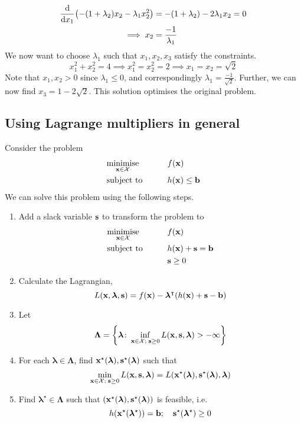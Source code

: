 \begin{example}
	\begin{align*}
		\dv{x_1} (-(1+\lambda_2) x_2 - \lambda_1 x_2^2) & = -(1+\lambda_2) - 2 \lambda_1 x_2 = 0 \\
		\implies x_2                                    & = \frac{-1}{\lambda_1}
	\end{align*}
	We now want to choose \(\lambda_1\) such that \(x_1, x_2, x_3\) satisfy the constraints.
	\[
		x_1^2 + x_2^2 = 4 \implies x_1^2 = x_2^2 = 2 \implies x_1 = x_2 = \sqrt{2}
	\]
	Note that \(x_1, x_2 > 0\) since \(\lambda_1 \leq 0\), and correspondingly \(\lambda_1 = \frac{-1}{\sqrt{2}}\).
	Further, we can now find \(x_3 = 1 - 2\sqrt{2}\).
	This solution optimises the original problem.
\end{example}

\subsection{Using Lagrange multipliers in general}
Consider the problem
\begin{alignat*}{2}
	 & \underset{\vb x \in \mathcal X}{\text{minimise}} & \qquad & f(\vb x)            \\
	 & \text{subject to}                                &        & h(\vb x) \leq \vb b
\end{alignat*}
We can solve this problem using the following steps.
\begin{enumerate}[(1)]
	\item Add a slack variable \(\vb s\) to transform the problem to
	      \begin{alignat*}{2}
		       & \underset{\vb x \in \mathcal X}{\text{minimise}} & \qquad & f(\vb x)                 \\
		       & \text{subject to}                                &        & h(\vb x) + \vb s = \vb b \\
		       &                                                  &        & \vb s \geq 0
	      \end{alignat*}
	\item Calculate the Lagrangian,
	      \[
		      L(\vb x, \bm \lambda, \vb s) = f(\vb x) - \bm \lambda^\intercal (h(\vb x) + \vb s - \vb b)
	      \]
	\item Let
	      \[
		      \bm \Lambda = \qty{\bm \lambda \colon \inf_{\vb x \in \mathcal X;\; \vb s \geq 0} L(\vb x, \vb s, \bm \lambda) > -\infty}
	      \]
	\item For each \(\bm\lambda \in \bm\Lambda\), find \(\vb x^\star(\bm \lambda), \vb s^\star(\bm \lambda)\) such that
	      \[
		      \min_{\vb x \in \mathcal X;\; \vb s \geq 0} L(\vb x, \vb s, \bm \lambda) = L(\vb x^\star(\bm \lambda), \vb s^\star(\bm \lambda), \bm \lambda)
	      \]
	\item Find \(\bm\lambda^\star \in \bm\Lambda\) such that \((\vb x^\star(\bm \lambda), \vb s^\star(\bm \lambda))\) is feasible, i.e.
	      \[
		      h(\vb x^\star(\bm \lambda^\star)) = \vb b;\quad \vb s^\star (\bm \lambda^\star) \geq 0
	      \]
\end{enumerate}

